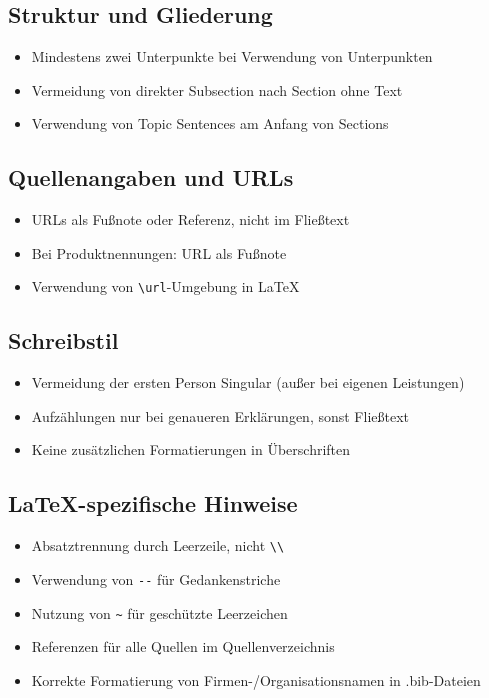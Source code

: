 \documentclass[12pt,a4paper,oneside]{article}
\begin{document}
\subsection{Struktur und Gliederung}
\begin{itemize}
    \item Mindestens zwei Unterpunkte bei Verwendung von Unterpunkten
    \item Vermeidung von direkter Subsection nach Section ohne Text
    \item Verwendung von \glqq Topic Sentences\grqq{} am Anfang von Sections
\end{itemize}

\subsection{Quellenangaben und URLs}
\begin{itemize}
    \item URLs als Fußnote oder Referenz, nicht im Fließtext
    \item Bei Produktnennungen: URL als Fußnote
    \item Verwendung von \verb|\url|-Umgebung in LaTeX
\end{itemize}

\subsection{Schreibstil}
\begin{itemize}
    \item Vermeidung der ersten Person Singular (außer bei eigenen Leistungen)
    \item Aufzählungen nur bei genaueren Erklärungen, sonst Fließtext
    \item Keine zusätzlichen Formatierungen in Überschriften
\end{itemize}

\subsection{LaTeX-spezifische Hinweise}
\begin{itemize}
    \item Absatztrennung durch Leerzeile, nicht \verb|\\|
    \item Verwendung von \verb|--| für Gedankenstriche
    \item Nutzung von \verb|~| für geschützte Leerzeichen
    \item Referenzen für alle Quellen im Quellenverzeichnis
    \item Korrekte Formatierung von Firmen-/Organisationsnamen in .bib-Dateien
\end{itemize}
\end{document}
